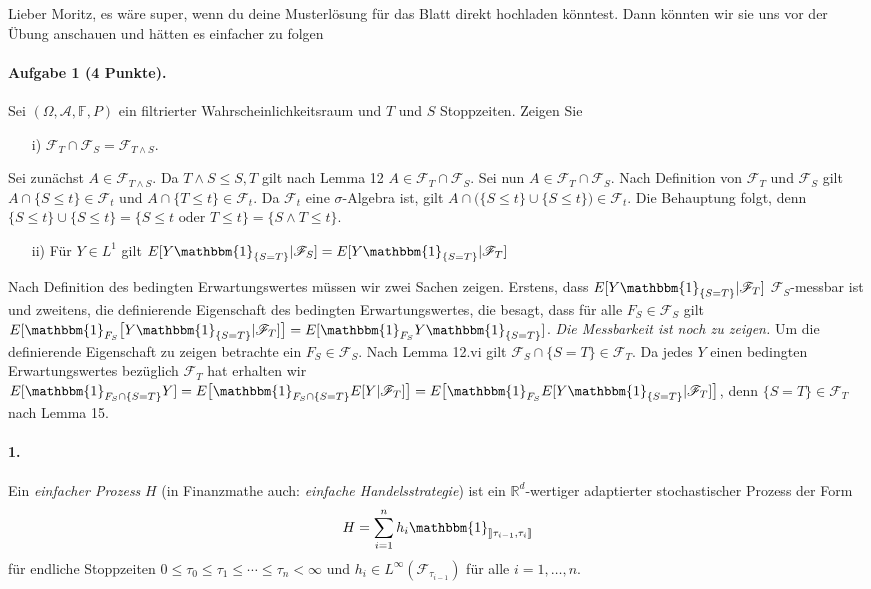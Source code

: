 \documentclass{article}
\begin{document}
Lieber Moritz, es wäre super, wenn du deine Musterlösung für das Blatt direkt hochladen könntest.
Dann könnten wir sie uns vor der Übung anschauen und hätten es einfacher zu folgen \smiley
\paragraph{Aufgabe 1 \textnormal{(4 Punkte)}.}
Sei $(\Omega,\mathscr{A},\mathbb{F},P)$ ein filtrierter Wahrscheinlichkeitsraum und $T$ und $S$ Stoppzeiten.
Zeigen Sie
\begin{itemize}
\item [i)] $\mathscr{F}_T\cap\mathscr{F}_S=\mathscr{F}_{T\wedge S}$.
\end{itemize}
Sei zunächst $A\in\mathscr{F}_{T\wedge S}$.
Da $T\wedge S\leq S,T$ gilt nach Lemma 12 $A\in\mathscr{F}_T\cap\mathscr{F}_S$.
Sei nun $A\in\mathscr{F}_T\cap\mathscr{F}_S$.
Nach Definition von $\mathscr{F}_T$ und $\mathscr{F}_S$ gilt $A\cap\{S\leq t\}\in\mathscr{F}_t$ und $A\cap\{T\leq t\}\in\mathscr{F}_t$.
Da $\mathscr{F}_t$ eine $\sigma$-Algebra ist, gilt $A\cap\bigl(\{S\leq t\}\cup \{S\leq t\}\bigr)\in\mathscr{F}_t$.
Die Behauptung folgt, denn $\{S\leq t\}\cup \{S\leq t\}=\bigl\{S\leq t\text{ oder }T\leq t\bigr\}=\{S\wedge T\leq t\}$.
\begin{itemize}
\item [ii)] Für $Y\in L^1$ gilt $E[Y\mathbbm{1}_{\{S=T\}}|\mathscr{F}_S]=E[Y\mathbbm{1}_{\{S=T\}}|\mathscr{F}_T]$
\end{itemize}
Nach Definition des bedingten Erwartungswertes müssen wir zwei Sachen zeigen. Erstens, dass $E[Y\mathbbm{1}_{\{S=T\}}|\mathscr{F}_T]$ $\mathscr{F}_S$-messbar ist und zweitens, die definierende Eigenschaft des bedingten Erwartungswertes, die besagt, dass für alle $F_S\in\mathscr{F}_S$ gilt $E[\mathbbm{1}_{F_S}\bigl[Y\mathbbm{1}_{\{S=T\}}|\mathscr{F}_T]\bigr]=E[\mathbbm{1}_{F_S}Y\mathbbm{1}_{\{S=T\}}]$.
\emph{Die Messbarkeit ist noch zu zeigen.}
Um die definierende Eigenschaft zu zeigen betrachte ein $F_S\in\mathscr{F}_S$.
Nach Lemma 12.vi gilt $\mathscr{F}_S\cap\{S=T\}\in\mathscr{F}_T$.
Da jedes $Y$ einen bedingten Erwartungswertes bezüglich $\mathscr{F}_T$ hat erhalten wir $E[\mathbbm{1}_{F_S\cap\{S=T\}}Y]=E\bigl[\mathbbm{1}_{F_S\cap\{S=T\}}E[Y|\mathscr{F}_T]\bigr]=E\bigl[\mathbbm{1}_{F_S}E[Y\mathbbm{1}_{\{S=T\}}|\mathscr{F}_T]\bigr]$, denn $\{S=T\}\in\mathscr{F}_T$ nach Lemma 15.

\paragraph{ 1.} Ein \emph{einfacher Prozess} $H$ (in Finanzmathe auch: \emph{einfache Handelsstrategie}) ist ein $\mathbb{R}^d$-wertiger adaptierter stochastischer Prozess der Form
\[
H=\sum_{i=1}^nh_i\mathbbm{1}_{\rrbracket\tau_{i-1},\tau_i\rrbracket}
\]
für endliche Stoppzeiten $0\leq\tau_0\leq\tau_1\leq\cdots\leq\tau_n<\infty$ und $h_i\in L^\infty(\mathscr{F}_{\tau_{i-1}})$ für alle $i=1,\dots,n$.
\end{document}
